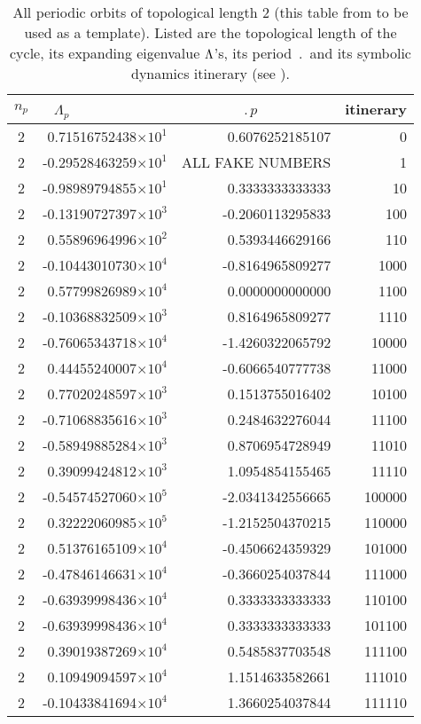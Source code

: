 
\begin{table}
\caption[]{ All periodic orbits of topological length 2
(this table from  to be used as a template).
Listed are the topological length of the cycle,
its expanding eigenvalue  $\Lambda$'s, its period $\period{}$
and its symbolic dynamics itinerary (see ).
  }
\begin{tabular}{|c|r|r|r|}
\hline
$n_p$ & $\Lambda_p$~~~~~~~~~~~~
                            &    $\period{p}$~~~~~~~~~
                                                 & itinerary\\ \hline
2 & 0.71516752438$\times 10^1$ &  0.6076252185107 & 0 \\
2 &-0.29528463259$\times 10^1$ &  ALL FAKE NUMBERS & 1 \\
   \hline
2 &-0.98989794855$\times 10^1$ &  0.3333333333333 & 10 \\
   \hline
2 &-0.13190727397$\times 10^3$ & -0.2060113295833 & 100 \\
2 & 0.55896964996$\times 10^2$ &  0.5393446629166 & 110 \\
   \hline
2 &-0.10443010730$\times 10^4$ & -0.8164965809277 & 1000 \\
2 & 0.57799826989$\times 10^4$ &  0.0000000000000 & 1100 \\
2 &-0.10368832509$\times 10^3$ &  0.8164965809277 & 1110 \\
   \hline
2 &-0.76065343718$\times 10^4$ & -1.4260322065792 & 10000 \\
2 & 0.44455240007$\times 10^4$ & -0.6066540777738 & 11000 \\
2 & 0.77020248597$\times 10^3$ &  0.1513755016402 & 10100 \\
2 &-0.71068835616$\times 10^3$ &  0.2484632276044 & 11100 \\
2 &-0.58949885284$\times 10^3$ &  0.8706954728949 & 11010 \\
2 & 0.39099424812$\times 10^3$ &  1.0954854155465 & 11110 \\
   \hline
2 &-0.54574527060$\times 10^5$ & -2.0341342556665 & 100000 \\
2 & 0.32222060985$\times 10^5$ & -1.2152504370215 & 110000 \\
2 & 0.51376165109$\times 10^4$ & -0.4506624359329 & 101000 \\
2 &-0.47846146631$\times 10^4$ & -0.3660254037844 & 111000 \\
2 &-0.63939998436$\times 10^4$ &  0.3333333333333 & 110100 \\
2 &-0.63939998436$\times 10^4$ &  0.3333333333333 & 101100 \\
2 & 0.39019387269$\times 10^4$ &  0.5485837703548 & 111100 \\
2 & 0.10949094597$\times 10^4$ &  1.1514633582661 & 111010 \\
2 &-0.10433841694$\times 10^4$ &  1.3660254037844 & 111110 \\
   \hline
\end{tabular}
\label{tabListLength2}
\end{table}
